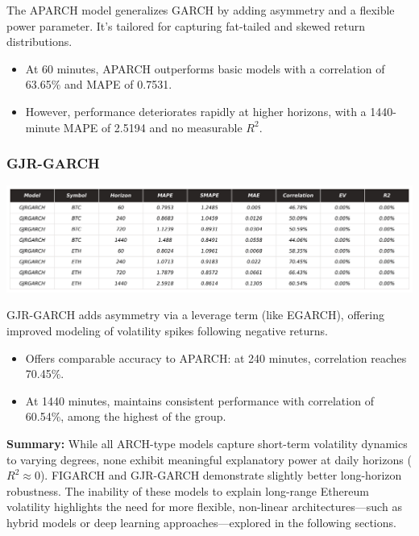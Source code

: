 \documentclass[9pt]{article}
\begin{document}
\begin{multicols}{2}
		The APARCH model generalizes GARCH by adding asymmetry and a flexible power parameter. It’s tailored for capturing fat-tailed and skewed return distributions.
		
		\begin{itemize}
			\item At 60 minutes, APARCH outperforms basic models with a correlation of 63.65\% and MAPE of 0.7531.
			\item However, performance deteriorates rapidly at higher horizons, with a 1440-minute MAPE of 2.5194 and no measurable \( R^2 \).
		\end{itemize}
		
		\subsubsection{GJR-GARCH}
		\centering
		\includegraphics[width=.95\columnwidth]{img/_KPI_GJRGARCH.png}
		\label{fig:_KPI_GJRGARCH}
		\justifying
		\medskip
		
		GJR-GARCH adds asymmetry via a leverage term (like EGARCH), offering improved modeling of volatility spikes following negative returns.
		
		\begin{itemize}
			\item Offers comparable accuracy to APARCH: at 240 minutes, correlation reaches 70.45\%.
			\item At 1440 minutes, maintains consistent performance with correlation of 60.54\%, among the highest of the group.
		\end{itemize}
		
		\textbf{Summary:} While all ARCH-type models capture short-term volatility dynamics to varying degrees, none exhibit meaningful explanatory power at daily horizons (\( R^2 \approx 0 \)). FIGARCH and GJR-GARCH demonstrate slightly better long-horizon robustness. The inability of these models to explain long-range Ethereum volatility highlights the need for more flexible, non-linear architectures—such as hybrid models or deep learning approaches—explored in the following sections.
		
	\end{multicols}
\end{document}
